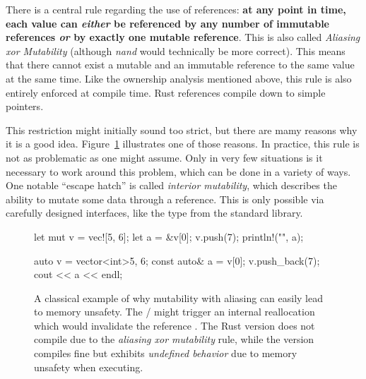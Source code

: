 {{There is a central rule regarding the use of references: \textbf{at any point in time, each value can \emph{either} be referenced by any number of immutable references \emph{or} by exactly one mutable reference}.
This is also called \emph{Aliasing xor Mutability} (although \emph{nand} would technically be more correct).
This means that there cannot exist a mutable and an immutable reference to the same value at the same time.
Like the ownership analysis mentioned above, this rule is also entirely enforced at compile time.
Rust references compile down to simple pointers.

This restriction might initially sound too strict, but there are mamy reasons why it is a good idea.
Figure~\ref{fig:vector-bad} illustrates one of those reasons.
In practice, this rule is not as problematic as one might assume.
Only in very few situations is it necessary to work around this problem, which can be done in a variety of ways.
One notable \enquote{escape hatch} is called \emph{interior mutability}, which describes the ability to mutate some data through a  reference.
This is only possible via carefully designed interfaces, like the type  from the standard library.

\begin{figure}[t]
  \centering
    \begin{minipage}[t]{.49\textwidth}
    \begin{rustcode}
      let mut v = vec![5, 6];
      let a = &v[0];
      v.push(7);
      println!("{}", a);
    \end{rustcode}
  \end{minipage}
  \begin{minipage}[t]{.49\textwidth}
    \begin{cppcode}
      auto v = vector<int>{5, 6};
      const auto& a = v[0];
      v.push_back(7);
      cout << a << endl;
    \end{cppcode}
  \end{minipage}
  \caption{
    A classical example of why mutability with aliasing can easily lead to memory unsafety.
    The / might trigger an internal reallocation which would invalidate the reference .
    The Rust version does not compile due to the \emph{aliasing xor mutability} rule, while the \cpp version compiles fine but exhibits \emph{undefined behavior} due to memory unsafety when executing.
  }
  \label{fig:vector-bad}
\end{figure}

}}
